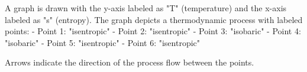 A graph is drawn with the y-axis labeled as "T" (temperature) and the x-axis labeled as "s" (entropy). The graph depicts a thermodynamic process with labeled points:  
- Point 1: "isentropic"  
- Point 2: "isentropic"  
- Point 3: "isobaric"  
- Point 4: "isobaric"  
- Point 5: "isentropic"  
- Point 6: "isentropic"  

Arrows indicate the direction of the process flow between the points.